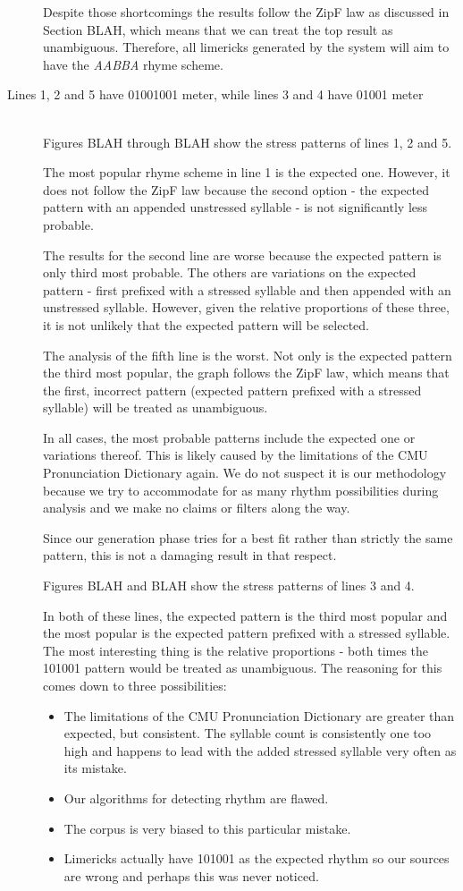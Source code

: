 \begin{description}
Despite those shortcomings the results follow the ZipF law as discussed in Section BLAH, which means that we can treat the top result as unambiguous. Therefore, all limericks generated by the system will aim to have the \textit{AABBA} rhyme scheme.

\item[Lines 1, 2 and 5 have 01001001 meter, while lines 3 and 4 have 01001 meter]  \hfill \\
Figures BLAH through BLAH show the stress patterns of lines 1, 2 and 5.

The most popular rhyme scheme in line 1 is the expected one. However, it does not follow the ZipF law because the second option - the expected pattern with an appended unstressed syllable - is not significantly less probable.

The results for the second line are worse because the expected pattern is only third most probable. The others are variations on the expected pattern - first prefixed with a stressed syllable and then appended with an unstressed syllable. However, given the relative proportions of these three, it is not unlikely that the expected pattern will be selected.

The analysis of the fifth line is the worst. Not only is the expected pattern the third most popular, the graph follows the ZipF law, which means that the first, incorrect pattern (expected pattern prefixed with a stressed syllable) will be treated as unambiguous.

In all cases, the most probable patterns include the expected one or variations thereof. This is likely caused by the limitations of the CMU Pronunciation Dictionary again. We do not suspect it is our methodology because we try to accommodate for as many rhythm possibilities during analysis and we make no claims or filters along the way. 

Since our generation phase tries for a best fit rather than strictly the same pattern, this is not a damaging result in that respect.

Figures BLAH and BLAH show the stress patterns of lines 3 and 4. 

In both of these lines, the expected pattern is the third most popular and the most popular is the expected pattern prefixed with a stressed syllable. The most interesting thing is the relative proportions - both times the 101001 pattern would be treated as unambiguous. The reasoning for this comes down to three possibilities:
\begin{itemize}
\item{The limitations of the CMU Pronunciation Dictionary are greater than expected, but consistent. The syllable count is consistently one too high and happens to lead with the added stressed syllable very often as its mistake.}
\item{Our algorithms for detecting rhythm are flawed.}
\item{The corpus is very biased to this particular mistake.}
\item{Limericks actually have 101001 as the expected rhythm so our sources are wrong and perhaps this was never noticed.}
\end{itemize}


\end{description}
